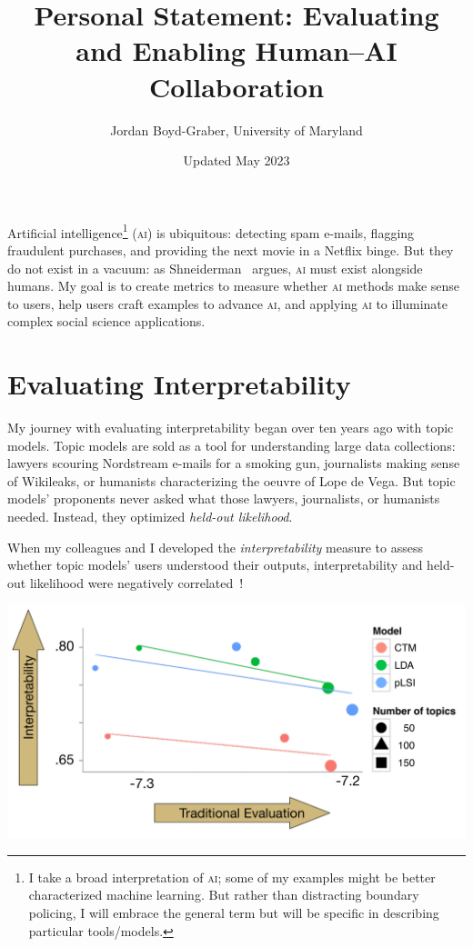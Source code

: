 \documentclass[11pt]{amsart}
\newcommand{\abr}[1]{\textsc{#1}}
\begin{document}
 \title{Personal Statement: Evaluating and Enabling Human--AI Collaboration}

 \author{Jordan Boyd-Graber, University of Maryland}


\date{Updated May 2023}

\maketitle

Artificial intelligence\footnote{I take a broad interpretation of
\abr{ai}; some of my examples might be better characterized machine
learning.  But rather than distracting boundary policing, I will embrace
the general term but will be specific in describing particular tools/models.}
(\abr{ai}) is ubiquitous: detecting spam e-mails, flagging fraudulent
purchases, and providing the next movie in a Netflix binge.
%
But they do not exist in a vacuum: as
Shneiderman~\cite{shneiderman-21} argues, \abr{ai} must exist
alongside humans.
%
My goal is to create metrics to measure whether \abr{ai} methods make
sense to users, help users craft examples to advance \abr{ai}, and
applying \abr{ai} to illuminate complex social
science applications.

\section{Evaluating Interpretability}

My journey with evaluating interpretability began over ten years ago
with topic models.
%
Topic models are sold as a tool for understanding large data
collections: lawyers scouring Nordstream e-mails for a smoking gun,
journalists making sense of Wikileaks, or humanists characterizing the
oeuvre of Lope de Vega.
%
But topic models' proponents never asked what those lawyers,
journalists, or humanists needed.
%
Instead, they optimized \emph{held-out likelihood}.

When my colleagues
and I developed the \emph{interpretability} measure to assess whether topic
models' users understood their outputs, interpretability and
held-out likelihood were negatively correlated~\cite{chang-09b}!
%

\begin{center}
\includegraphics[width=.5\linewidth]{images/prec_ll_4}
\end{center}
\end{document}
